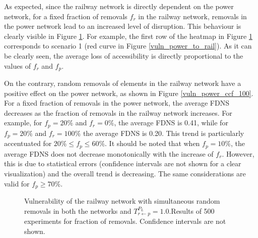 \documentclass[review]{elsarticle}
\begin{document}
As expected, since the railway network is directly dependent on the power network, for a fixed fraction of removals $f_r$ in the railway network, removals in the power network lead to an increased level of disruption. This behaviour is clearly visible in Figure \ref{vuln_rail_ccf_100}. For example, the first row of the heatmap in Figure \ref{vuln_rail_ccf_100} corresponds to scenario 1 (red curve in Figure \ref{vuln_power_to_rail}). As it can be clearly seen, the average loss of accessibility is directly proportional to the values of $f_r$ and $f_p$.

On the contrary, random removals of elements in the railway network have a positive effect on the power network, as shown in Figure \ref{vuln_power_ccf_100}. For a fixed fraction of removals in the power network, the average FDNS decreases as the fraction of removals in the railway network increases. For example, for $f_p=20\%$ and $f_r=0\%$, the average FDNS is 0.41, while for $f_p=20\%$ and $f_r=100\%$ the average FDNS is 0.20. This trend is particularly accentuated for $20\% \le f_p \le 60\%$. It should be noted that when $f_p=10\%$, the average FDNS does not decrease monotonically with the increase of $f_r$. However, this is due to statistical errors (confidence intervals are not shown for a clear visualization) and the overall trend is decreasing. The same considerations are valid for $f_p \ge 70\%$.


	\begin{figure}[h]
	\centering
	\caption{Vulnerability of the railway network with simultaneous random removals in both the networks and $T_{r \leftarrow p}^{P_L}=1.0$.Results of 500 experiments for fraction of removals. Confidence intervals are not shown.}
	\label{vuln_rail_ccf_100}
\end{figure}
\end{document}
